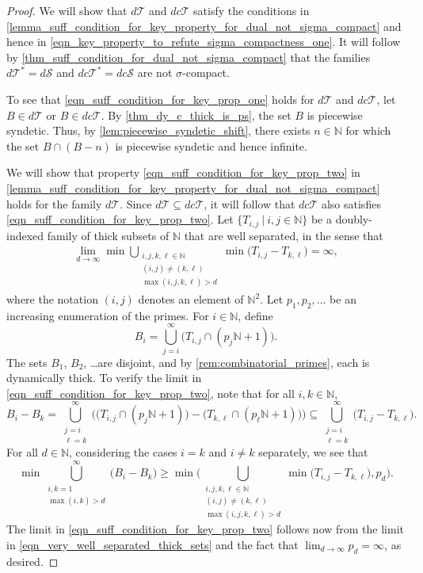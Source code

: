 \documentclass[letter,11pt]{article}
\theoremstyle{plain}
\theoremstyle{definition}
\theoremstyle{plain}
\theoremstyle{plain}
\numberwithin{equation}{section}
\newcommand{\N}{\mathbb{N}}
\renewcommand{\geq}{\geqslant}
\newcommand{\dsyndetic}{d\mathcal{S}}
\newcommand{\dthick}{d\mathcal{T}}
\newcommand{\dcsyndetic}{dc\mathcal{S}}
\newcommand{\dcthick}{dc\mathcal{T}}
\begin{document}
\begin{proof}
    We will show that $\dthick$ and $\dcthick$ satisfy the conditions in \cref{lemma_suff_condition_for_key_property_for_dual_not_sigma_compact} and hence in \eqref{eqn_key_property_to_refute_sigma_compactness_one}. It will follow by \cref{thm_suff_condition_for_dual_not_sigma_compact} that the families $\dthick^* = \dsyndetic$ and $\dcthick^* = \dcsyndetic$ are not $\sigma$-compact.
    
    To see that \eqref{eqn_suff_condition_for_key_prop_one} holds for $\dthick$ and $\dcthick$, let $B \in \dthick$ or $B \in \dcthick$. By \cref{thm_dy_c_thick_is_ps}, the set $B$ is piecewise syndetic. Thus, by \cref{lem:piecewise_syndetic_shift}, there exists $n \in \N$ for which the set $B \cap (B-n)$ is piecewise syndetic and hence infinite. 
    
    
    We will show that property \eqref{eqn_suff_condition_for_key_prop_two} in \cref{lemma_suff_condition_for_key_property_for_dual_not_sigma_compact} holds for the family $\dthick$. Since $\dthick \subseteq \dcthick$, it will follow that $\dcthick$ also satisfies \eqref{eqn_suff_condition_for_key_prop_two}. Let $\{T_{i,j} \ | \ i, j \in \N\}$ be a doubly-indexed family of thick subsets of $\N$ that are well separated, in the sense that
    \begin{align}
    \label{eqn_very_well_separated_thick_sets}
        \lim_{d \to \infty} \min \bigcup_{\substack{ i, j, k, \ell \in \N \\ (i,j) \neq (k, \ell) \\ \max(i,j,k,\ell) > d}} \min \big(T_{i,j} - T_{k,\ell} \big) = \infty,
    \end{align}
    where the notation $(i,j)$ denotes an element of $\N^2$.
    Let $p_1, p_2, \ldots$ be an increasing enumeration of the primes.  For $i \in \N$, define
    \[B_i = \bigcup_{j = i}^\infty \big(T_{i,j} \cap (p_j \N + 1) \big).\]
    The sets $B_1$, $B_2$, \dots are disjoint, and by \cref{rem:combinatorial_primes}, each is dynamically thick.  To verify the limit in \eqref{eqn_suff_condition_for_key_prop_two}, note that for all $i, k \in \N$,
    \[B_i - B_k = \bigcup_{\substack{j=i\\ \ell = k}}^\infty \Big ( \big( T_{i,j} \cap (p_j \N + 1) \big) - \big( T_{k,\ell} \cap (p_\ell \N + 1) \big) \Big) \subseteq \bigcup_{\substack{j=i\\ \ell = k}}^\infty \big( T_{i,j} - T_{k,\ell} \big).\]
    For all $d \in \N$, considering the cases $i=k$ and $i \neq k$ separately, we see that
    \[\min \bigcup_{\substack{i,k = 1 \\ \max(i,k) > d}}^\infty \big( B_i - B_k\big) \geq \min \bigg( \bigcup_{\substack{ i, j, k, \ell \in \N \\ (i,j) \neq (k, \ell) \\ \max(i,j,k,\ell) > d}} \min \big(T_{i,j} - T_{k,\ell} \big), p_{d} \bigg).\]
    The limit in \eqref{eqn_suff_condition_for_key_prop_two} follows now from the limit in \eqref{eqn_very_well_separated_thick_sets} and the fact that $\lim_{d \to \infty} p_d = \infty$, as desired.
\end{proof}
\end{document}

